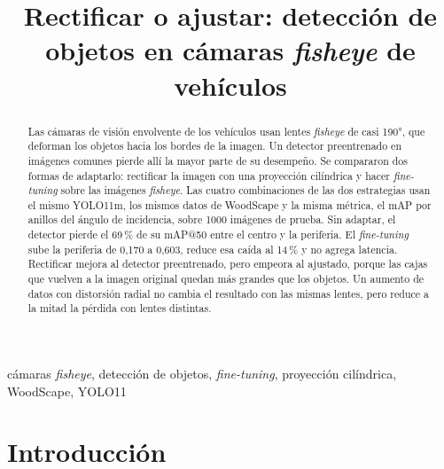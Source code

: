 \documentclass[conference]{IEEEtran}
\begin{document}
\title{Rectificar o ajustar: detección de objetos en cámaras \textit{fisheye} de vehículos}

\author{
}

\maketitle

\begin{abstract}
Las cámaras de visión envolvente de los vehículos usan lentes \textit{fisheye} de casi 190°, que deforman los objetos hacia los bordes de la imagen. Un detector preentrenado en imágenes comunes pierde allí la mayor parte de su desempeño. Se compararon dos formas de adaptarlo: rectificar la imagen con una proyección cilíndrica y hacer \textit{fine-tuning} sobre las imágenes \textit{fisheye}. Las cuatro combinaciones de las dos estrategias usan el mismo YOLO11m, los mismos datos de WoodScape y la misma métrica, el mAP por anillos del ángulo de incidencia, sobre 1000 imágenes de prueba. Sin adaptar, el detector pierde el 69\,\% de su mAP@50 entre el centro y la periferia. El \textit{fine-tuning} sube la periferia de 0,170 a 0,603, reduce esa caída al 14\,\% y no agrega latencia. Rectificar mejora al detector preentrenado, pero empeora al ajustado, porque las cajas que vuelven a la imagen original quedan más grandes que los objetos. Un aumento de datos con distorsión radial no cambia el resultado con las mismas lentes, pero reduce a la mitad la pérdida con lentes distintas.
\end{abstract}

\begin{IEEEkeywords}
cámaras \textit{fisheye}, detección de objetos, \textit{fine-tuning}, proyección cilíndrica, WoodScape, YOLO11
\end{IEEEkeywords}

\section{Introducción}
\end{document}

